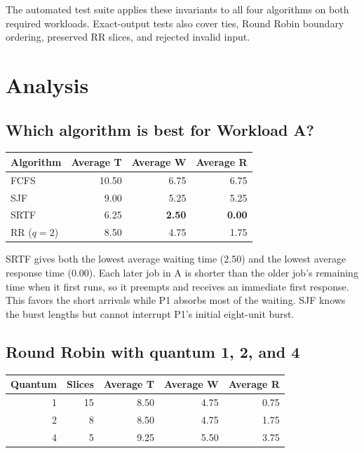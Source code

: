 \documentclass[11pt,a4paper]{article}
\begin{document}
The automated test suite applies these invariants to all four algorithms on both
required workloads. Exact-output tests also cover ties, Round Robin boundary
ordering, preserved RR slices, and rejected invalid input.

\section{Analysis}

\subsection{Which algorithm is best for Workload A?}

\begin{table}[H]
  \centering
  \begin{tabular}{lrrr}
    \toprule
    Algorithm  & Average T & Average W     & Average R     \\
    \midrule
    FCFS       & 10.50     & 6.75          & 6.75          \\
    SJF        & 9.00      & 5.25          & 5.25          \\
    SRTF       & 6.25      & \textbf{2.50} & \textbf{0.00} \\
    RR ($q=2$) & 8.50      & 4.75          & 1.75          \\
    \bottomrule
  \end{tabular}
\end{table}

SRTF gives both the lowest average waiting time (2.50) and the lowest average
response time (0.00). Each later job in A is shorter than the older job's remaining
time when it first runs, so it preempts and receives an immediate first response.
This favors the short arrivals while P1 absorbs most of the waiting. SJF knows the
burst lengths but cannot interrupt P1's initial eight-unit burst.

\subsection{Round Robin with quantum 1, 2, and 4}

\begin{table}[H]
  \centering
  \begin{tabular}{rrrrr}
    \toprule
    Quantum & Slices & Average T & Average W & Average R \\
    \midrule
    1       & 15     & 8.50      & 4.75      & 0.75      \\
    2       & 8      & 8.50      & 4.75      & 1.75      \\
    4       & 5      & 9.25      & 5.50      & 3.75      \\
    \bottomrule
  \end{tabular}
\end{table}
\end{document}
